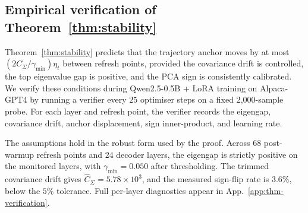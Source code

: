 \begin{center}
\end{center}

\subsection{Empirical verification of Theorem~\ref{thm:stability}}
\label{sec:thm-empirical}

Theorem~\ref{thm:stability} predicts that the trajectory anchor
moves by at most $(2C_\Sigma/\gamma_{\min})\eta_t$ between refresh
points, provided the covariance drift is controlled, the top
eigenvalue gap is positive, and the PCA sign is consistently
calibrated. We verify these conditions during Qwen2.5-0.5B + LoRA
training on Alpaca-GPT4 by running a verifier every $25$ optimiser
steps on a fixed 2{,}000-sample probe. For each layer and refresh
point, the verifier records the eigengap, covariance drift, anchor
displacement, sign inner-product, and learning rate.

The assumptions hold in the robust form used by the proof. Across
$68$ post-warmup refresh points and $24$ decoder layers, the
eigengap is strictly positive on the monitored layers, with
$\gamma_{\min}=0.050$ after thresholding. The trimmed covariance
drift gives $\hat{C}_\Sigma=5.78\times 10^3$, and the measured
sign-flip rate is $3.6\%$, below the $5\%$ tolerance. Full
per-layer diagnostics appear in App.~\ref{app:thm-verification}.

